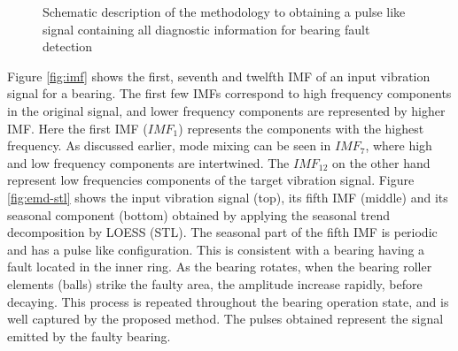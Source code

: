 \documentclass[../Main/thesis.tex]{subfiles}
\begin{document}
\begin{figure}[H]
  \caption{Schematic description of the methodology to obtaining a pulse like signal containing all diagnostic information for bearing fault detection}
   \label{fig:pulse}
\end{figure}
\justify
Figure \ref{fig:imf} shows the first, seventh and twelfth IMF of an input vibration signal for a bearing. The first few IMFs correspond to high frequency components in the original signal, and lower frequency components are represented by higher IMF. Here the first IMF ($IMF_{1}$) represents the components with the highest frequency. As discussed earlier, mode mixing can be seen in $IMF_{7}$, where high and low frequency components are intertwined. The $IMF_{12}$ on the other hand represent low frequencies components of the target vibration signal.
Figure \ref{fig:emd-stl} shows  the input vibration signal (top), its fifth IMF (middle) and its seasonal component (bottom) obtained by applying the seasonal trend decomposition by LOESS (STL).   
\justify
The seasonal part of the fifth IMF is periodic and has a pulse like configuration. This is consistent with a bearing having a fault located in the inner ring. As the bearing rotates, when the bearing roller elements (balls) strike the faulty area, the amplitude increase rapidly, before decaying. This process is repeated throughout the bearing operation state, and is well captured by the proposed method. The pulses obtained represent the signal emitted by the faulty bearing.
\end{document}
